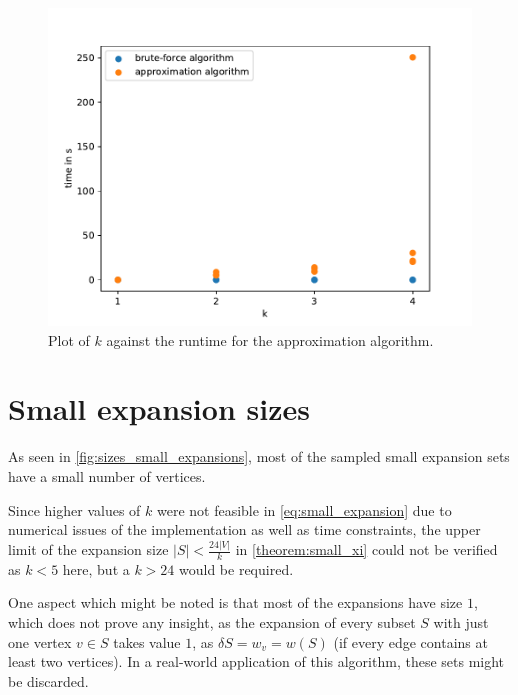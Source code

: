 \begin{figure}
	\centering
	\includegraphics[scale=0.8]{figures/k_all_logs.pdf}
	\caption[Plot k time ]{Plot of $k$ against the runtime for the approximation algorithm.\label{fig:k_time}}
\end{figure}

\section{Small expansion sizes}

As seen in \cref{fig:sizes_small_expansions}, most of the sampled small expansion sets have a small number of vertices. %


Since higher values of $k$ were not feasible in \cref{eq:small_expansion} due to numerical issues of the implementation as well as time constraints, the upper limit of the expansion size $|S|<\frac{24|V|}{k}$ in \cref{theorem:small_xi} could not be verified as $k<5$ here, but a $k>24$ would be required.

One aspect which might be noted is that most of the expansions have size $1$, which does not prove any insight, as the expansion of every subset $S$ with just one vertex $v\in S$ takes value $1$, as $\delta S = w_v = w(S)$ (if every edge contains at least two vertices). In a real-world application of this algorithm, these sets might be discarded.




